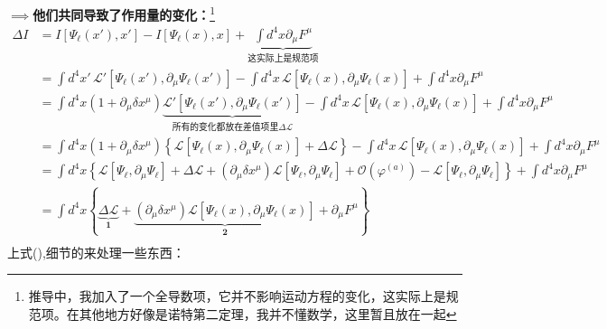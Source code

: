 \(\implies\)\textbf{他们共同导致了作用量的变化：}\footnote{推导中，我加入了一个全导数项，它并不影响运动方程的变化，这实际上是规范项。在其他地方好像是诺特第二定理，我并不懂数学，这里暂且放在一起} 
\begin{equation}
    \begin{aligned}\label{3.2}
          \Delta I &=I[\Psi_\ell (x'),x']-I[\Psi_\ell(x),x]+\underbrace{\int d^4x\partial_\mu F^\mu}_\text{这实际上是规范项}\\
          &= \int d^4 x' \, \mathscr{L}'[\Psi_\ell (x'), \partial_\mu \Psi_\ell (x')] - \int d^4 x \, \mathscr{L}[\Psi_\ell(x), \partial_\mu \Psi_\ell(x)]+\int d^4x\partial_\mu F^\mu \\
          &= \int d^4 x (1 + \partial_\mu \delta x^\mu) \underbrace{\mathscr{L}'[\Psi_\ell (x'), \partial_\mu \Psi_\ell (x')]}_{\text{所有的变化都放在差值项里}\Delta\mathscr{L}} - \int d^4 x \, \mathscr{L}[\Psi_\ell(x), \partial_\mu \Psi_\ell(x)] +\int d^4x\partial_\mu F^\mu \\
          &= \int d^4 x (1 + \partial_\mu \delta x^\mu) \left\{\mathscr{L}[\Psi_\ell(x), \partial_\mu \Psi_\ell(x)]+\Delta\mathscr{L}\right\} - \int d^4 x \, \mathscr{L}[\Psi_\ell(x), \partial_\mu \Psi_\ell(x)]  +\int d^4x\partial_\mu F^\mu\\          
          &= \int d^4 x \left\{ \mathscr{L}[\Psi_\ell, \partial_\mu \Psi_\ell]+\Delta\mathscr{L} + (\partial_\mu \delta x^\mu) \mathscr{L}[\Psi_\ell , \partial_\mu \Psi_\ell ]  +\mathscr{O}(\varphi^{(a)})- \mathscr{L}[\Psi_\ell, \partial_\mu \Psi_\ell]\right\} +\int d^4x\partial_\mu F^\mu\\
          &= \int d^4 x \left\{ \underbrace{\Delta\mathscr{L}}_{\mathbf{1}}
          + \underbrace{(\partial_\mu \delta x^\mu )\mathscr{L}[\Psi_\ell (x), \partial_\mu \Psi_\ell (x)]}_{\mathbf{2}} +\partial_\mu F^\mu\right\} \\
    \end{aligned}
\end{equation}
上式(),细节的来处理一些东西：
